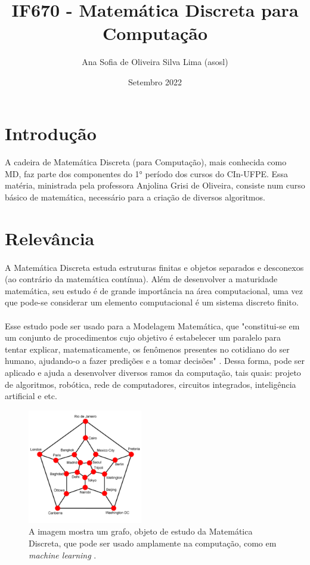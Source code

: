 \documentclass{article}
\title{IF670 - Matemática Discreta para Computação}
\author{Ana Sofia de Oliveira Silva Lima (asosl)}
\date{Setembro 2022}
\begin{document}
\maketitle

\section{Introdução} 
    \paragraph{}A cadeira de Matemática Discreta (para Computação), mais conhecida como MD, faz parte dos componentes do 1° período dos cursos do CIn-UFPE. Essa matéria, ministrada pela professora Anjolina Grisi de Oliveira, consiste num curso básico de matemática, necessário para a criação de diversos algoritmos.
    
\section{Relevância}
    \paragraph{}A Matemática Discreta estuda estruturas finitas e objetos separados e desconexos (ao contrário da matemática contínua). Além de desenvolver a maturidade matemática, seu estudo é de grande importância na área computacional, uma vez que pode-se considerar um elemento computacional é um sistema discreto finito. \cite{book1}
    \paragraph{}Esse estudo pode ser usado para a Modelagem Matemática, que "constitui-se em um conjunto de procedimentos cujo objetivo é estabelecer um paralelo para tentar explicar, matematicamente, os fenômenos presentes no cotidiano do ser humano, ajudando-o a fazer predições e a tomar decisões" \cite{paper1}. Dessa forma, pode ser aplicado e ajuda a desenvolver diversos ramos da computação, tais quais: projeto de algoritmos, robótica, rede de computadores, circuitos integrados, inteligência artificial e etc. \cite{paper2}
    
    \begin{figure}
        \centering
        \includegraphics[width=5cm, height=5cm]{grafos.png}
        \caption{A imagem mostra um grafo, objeto de estudo da Matemática Discreta, que pode ser usado amplamente na computação, como em \textit{machine learning} \cite{fig1}.}
        \label{Figura 1}
    \end{figure}
    
\end{document}
